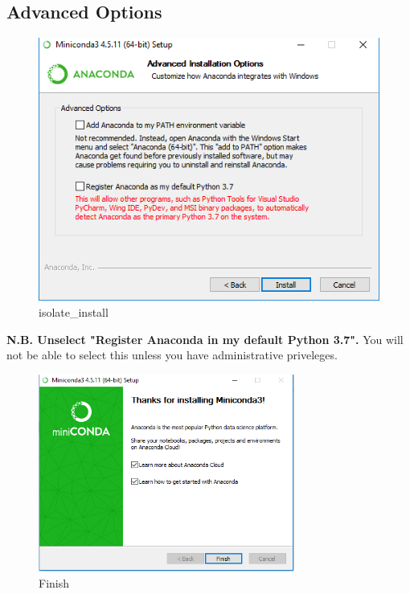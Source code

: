 \documentclass{report}
\begin{document}
\subsection*{Advanced Options}
\begin{figure}[H]
\centering
\includegraphics{./images/Isolated_Installation.PNG}
\caption{isolate\_install}
\end{figure}

\begin{center}
\textbf{N.B. Unselect "Register Anaconda in my default Python 3.7".} You will not be able to select this unless you have administrative priveleges.
\end{center}


\begin{figure}[H]
\centering
\includegraphics[width=0.75\textwidth]{./images/Finish.PNG}
\caption{Finish}
\end{figure}
\end{document}
